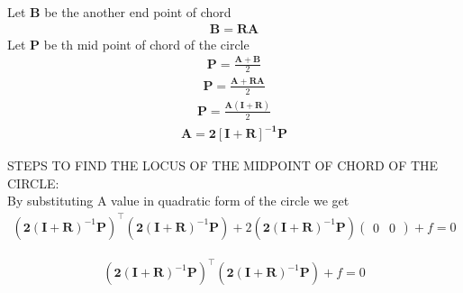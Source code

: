 \documentclass[10pt, a4paper]{article}
\newcommand{\myvec}[1]{\ensuremath{\begin{pmatrix}#1\end{pmatrix}}}
\let\vec\mathbf
\begin{document}
Let $\vec{B}$ be the another end point of chord \\\vspace{1mm}
\begin{align}
    \vec{B} =\vec{R}\vec{A}
\end{align}
Let $\vec{P}$ be th mid point of chord of the circle
\begin{align}
    \vec{P} = \frac{\vec{A}+\vec{B}}{2}
\end{align}
\begin{align}
     \vec{P} = \frac{\vec{A}+\vec{R}\vec{A}}{2}
\end{align}
\begin{align}
     \vec{P} = \frac{\vec{A(I+R)}}{2}
\end{align}
\begin{align}
     \vec{A} =\vec{2[I+R]^{-1}P}
\end{align}

STEPS TO FIND THE LOCUS OF THE MIDPOINT OF CHORD OF THE CIRCLE:\\
By substituting A value in quadratic form of the circle we get
\begin{align}
(\vec{2(I+R)}^{-1}\vec{P})^{\top}(\vec{2(I+R)}^{-1}\vec{P})+2(\vec{2(I+R)}^{-1}\vec{P})\myvec{0 & 0}+f=0
\end{align}

\begin{align}
(\vec{2(I+R)}^{-1}\vec{P})^{\top}(\vec{2(I+R)}^{-1}\vec{P})+f=0
\end{align}
\end{document}
